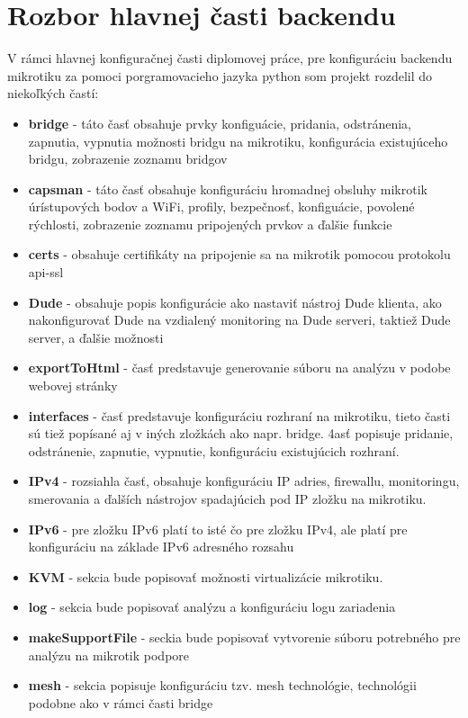 \section{Rozbor hlavnej časti backendu}
V rámci hlavnej konfiguračnej časti diplomovej práce, pre konfiguráciu backendu mikrotiku za pomoci porgramovacieho jazyka python som projekt rozdelil do niekoľkých častí:\begin{itemize}
\item \textbf{bridge} - táto časť obsahuje prvky konfiguácie, pridania, odstránenia, zapnutia, vypnutia možnosti bridgu na mikrotiku, konfigurácia existujúceho bridgu, zobrazenie zoznamu bridgov
\item  \textbf{capsman} - táto časť obsahuje konfiguráciu hromadnej obsluhy mikrotik úrístupových bodov a WiFi, profily, bezpečnosť, konfiguácie, povolené rýchlosti, zobrazenie zoznamu pripojených prvkov a ďalšie funkcie
\item \textbf{certs} - obsahuje certifikáty na pripojenie sa na mikrotik pomocou protokolu api-ssl
\item \textbf{Dude} - obsahuje popis konfigurácie ako nastaviť nástroj Dude klienta, ako nakonfigurovať Dude na vzdialený monitoring na Dude serveri, taktiež Dude server, a ďalšie možnosti
\item \textbf{exportToHtml} - časť predstavuje generovanie súboru na analýzu v podobe webovej stránky
\item \textbf{interfaces} - časť predstavuje konfiguráciu rozhraní na mikrotiku, tieto časti sú tiež popísané aj v iných zložkách ako napr. bridge. 4asť popisuje pridanie, odstránenie, zapnutie, vypnutie, konfiguráciu existujúcich rozhraní.
\item \textbf{IPv4} - rozsiahla časť, obsahuje konfiguráciu IP adries, firewallu, monitoringu, smerovania a ďalších nástrojov spadajúcich pod IP zložku na mikrotiku.
\item \textbf{IPv6} - pre zložku IPv6 platí to isté čo pre zložku IPv4, ale platí pre konfiguráciu na základe IPv6 adresného rozsahu
\item \textbf{KVM} - sekcia bude popisovať možnosti virtualizácie mikrotiku.
\item \textbf{log} - sekcia bude popisovať analýzu a konfiguráciu logu zariadenia
\item \textbf{makeSupportFile} - seckia bude popisovať vytvorenie súboru potrebného pre analýzu na mikrotik podpore
\item \textbf{mesh} - sekcia popisuje konfiguráciu tzv. mesh technológie, technológii podobne ako  v rámci časti bridge

\end{itemize}
